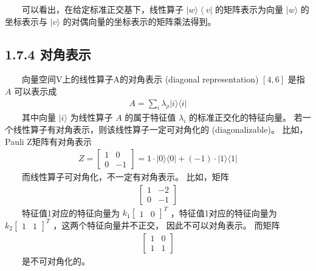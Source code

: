 \documentclass[a4paper,11pt,english]{sphinxmanual}
\begin{document}
\sphinxAtStartPar
​  可以看出，在给定标准正交基下，线性算子  \(|w\rangle\left\langle\left. v\right| \right.\) 的矩阵表示为向量 \(\mid {w}\rangle\) 的坐标表示与  \(| {v}\rangle\) 的对偶向量的坐标表示的矩阵乘法得到。


\subsection{1.7.4 对角表示}
\label{\detokenize{rst/_u9644_u5f551_u91cf_u5b50_u8ba1_u7b97_u6570_u5b66_u57fa_u78405:id6}}
\sphinxAtStartPar
​  向量空间V上的线性算子A的对角表示 (diagonal representation)  \([4,6]\)  是指 \(A\) 可以表示成
\begin{equation*}
\begin{split}A=\sum_{i} \lambda_{\rho}|i\rangle\langle i|\end{split}
\end{equation*}
\sphinxAtStartPar
​  其中向量  \(|i\rangle\)  为线性算子 \(A\) 的属于特征值 \(\lambda_{i}\)  的标准正交化的特征向量。 若一个线性算子有对角表示，则该线性算子一定可对角化的 (diagonalizable)。 比如，Pauli Z矩阵有对角表示
\begin{equation*}
\begin{split}Z=\left[\begin{array}{cc} 1 & 0 \\ 0 & -1 \end{array}\right]=1 \cdot|0\rangle\langle 0|+(-1) \cdot| 1\rangle\langle 1|\end{split}
\end{equation*}
\sphinxAtStartPar
​  而线性算子可对角化，不一定有对角表示。 比如，矩阵
\begin{equation*}
\begin{split}\left[\begin{array}{ll} 1 & -2 \\ 0 & -1 \end{array}\right]\end{split}
\end{equation*}
\sphinxAtStartPar
​  特征值1对应的特征向量为  \(k_{1}\left[\begin{array}{cc}1 & 0\end{array}\right]^{T}\)  ，特征值\sphinxhyphen{}1对应的特征向量为  \(k_{2}\left[\begin{array}{cc}1 & 1\end{array}\right]^{T}\)  ，这两个特征向量并不正交， 因此不可以对角表示。 而矩阵
\begin{equation*}
\begin{split}\left[\begin{array}{ll} 1 & 0 \\ 1 & 1 \end{array}\right]\end{split}
\end{equation*}
\sphinxAtStartPar
​  是不可对角化的。
\end{document}
